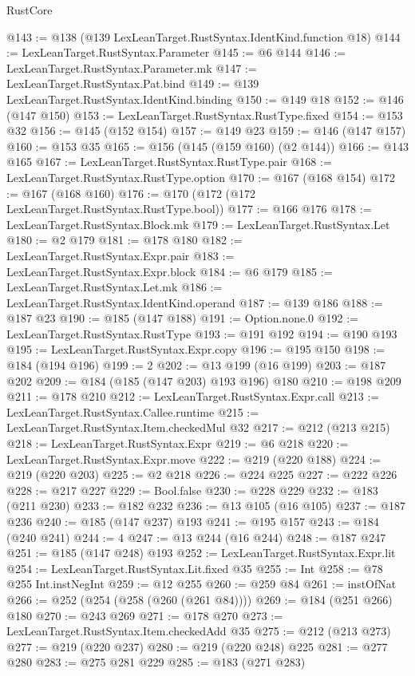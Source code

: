 \begin{lexlean}{RustCore}
\begin{coremodule}
@143 := @138 (@139 LexLeanTarget.RustSyntax.IdentKind.function @18)
@144 := LexLeanTarget.RustSyntax.Parameter
@145 := @6 @144
@146 := LexLeanTarget.RustSyntax.Parameter.mk
@147 := LexLeanTarget.RustSyntax.Pat.bind
@149 := @139 LexLeanTarget.RustSyntax.IdentKind.binding
@150 := @149 @18
@152 := @146 (@147 @150)
@153 := LexLeanTarget.RustSyntax.RustType.fixed
@154 := @153 @32
@156 := @145 (@152 @154)
@157 := @149 @23
@159 := @146 (@147 @157)
@160 := @153 @35
@165 := @156 (@145 (@159 @160) (@2 @144))
@166 := @143 @165
@167 := LexLeanTarget.RustSyntax.RustType.pair
@168 := LexLeanTarget.RustSyntax.RustType.option
@170 := @167 (@168 @154)
@172 := @167 (@168 @160)
@176 := @170 (@172 (@172 LexLeanTarget.RustSyntax.RustType.bool))
@177 := @166 @176
@178 := LexLeanTarget.RustSyntax.Block.mk
@179 := LexLeanTarget.RustSyntax.Let
@180 := @2 @179
@181 := @178 @180
@182 := LexLeanTarget.RustSyntax.Expr.pair
@183 := LexLeanTarget.RustSyntax.Expr.block
@184 := @6 @179
@185 := LexLeanTarget.RustSyntax.Let.mk
@186 := LexLeanTarget.RustSyntax.IdentKind.operand
@187 := @139 @186
@188 := @187 @23
@190 := @185 (@147 @188)
@191 := Option.none.{0}
@192 := LexLeanTarget.RustSyntax.RustType
@193 := @191 @192
@194 := @190 @193
@195 := LexLeanTarget.RustSyntax.Expr.copy
@196 := @195 @150
@198 := @184 (@194 @196)
@199 := 2
@202 := @13 @199 (@16 @199)
@203 := @187 @202
@209 := @184 (@185 (@147 @203) @193 @196) @180
@210 := @198 @209
@211 := @178 @210
@212 := LexLeanTarget.RustSyntax.Expr.call
@213 := LexLeanTarget.RustSyntax.Callee.runtime
@215 := LexLeanTarget.RustSyntax.Item.checkedMul @32
@217 := @212 (@213 @215)
@218 := LexLeanTarget.RustSyntax.Expr
@219 := @6 @218
@220 := LexLeanTarget.RustSyntax.Expr.move
@222 := @219 (@220 @188)
@224 := @219 (@220 @203)
@225 := @2 @218
@226 := @224 @225
@227 := @222 @226
@228 := @217 @227
@229 := Bool.false
@230 := @228 @229
@232 := @183 (@211 @230)
@233 := @182 @232
@236 := @13 @105 (@16 @105)
@237 := @187 @236
@240 := @185 (@147 @237) @193
@241 := @195 @157
@243 := @184 (@240 @241)
@244 := 4
@247 := @13 @244 (@16 @244)
@248 := @187 @247
@251 := @185 (@147 @248) @193
@252 := LexLeanTarget.RustSyntax.Expr.lit
@254 := LexLeanTarget.RustSyntax.Lit.fixed @35
@255 := Int
@258 := @78 @255 Int.instNegInt
@259 := @12 @255
@260 := @259 @84
@261 := instOfNat
@266 := @252 (@254 (@258 (@260 (@261 @84))))
@269 := @184 (@251 @266) @180
@270 := @243 @269
@271 := @178 @270
@273 := LexLeanTarget.RustSyntax.Item.checkedAdd @35
@275 := @212 (@213 @273)
@277 := @219 (@220 @237)
@280 := @219 (@220 @248) @225
@281 := @277 @280
@283 := @275 @281 @229
@285 := @183 (@271 @283)

\end{coremodule}
\end{lexlean}
